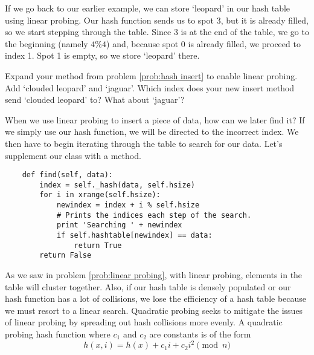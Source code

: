 If we go back to our earlier example, we can store `leopard' in our hash table using linear probing.
Our hash function sends us to spot 3, but it is already filled, so we start stepping through the table.
Since 3 is at the end of the table, we go to the beginning (namely $4 \% 4$) and, because spot 0 is already filled, we proceed to index 1.
Spot 1 is empty, so we store `leopard' there.
\begin{center}
\end{center}
\begin{problem}
Expand your  method from problem \ref{prob:hash insert} to enable linear probing. Add `clouded leopard' and `jaguar'. Which index does your new insert method send `clouded leopard' to? What about `jaguar'?
\label{prob:linear probing}
\end{problem}

When we use linear probing to insert a piece of data, how can we later find it?
If we simply use our hash function, we will be directed to the incorrect index.
We then have to begin iterating through the table to search for our data.
Let's supplement our  class with a  method.
\begin{lstlisting}
    def find(self, data):
        index = self._hash(data, self.hsize)
        for i in xrange(self.hsize):
            newindex = index + i % self.hsize
            # Prints the indices each step of the search.
            print 'Searching ' + newindex
            if self.hashtable[newindex] == data:
                return True
        return False
\end{lstlisting}

As we saw in problem \ref{prob:linear probing}, with linear probing, elements in the table will cluster together.
Also, if our hash table is densely populated or our hash function has a lot of collisions, we lose the efficiency of a hash table because we must resort to a linear search.
Quadratic probing seeks to mitigate the issues of linear probing by spreading out hash collisions more evenly.
A quadratic probing hash function where $c_1$ and $c_2$ are constants is of the form
\begin{equation*}
h(x, i) = h(x) + c_1i + c_2i^2 \pmod{n}
\end{equation*}

